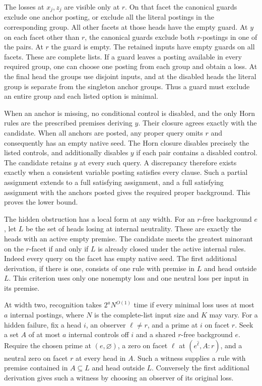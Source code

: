 The losses at $x_j,z_j$ are visible only at $r$.
On that facet the canonical guards exclude one anchor
posting, or exclude all the literal postings in the
corresponding group. All other facets at those heads
have the empty guard. At $y$ on each facet other than
$r$, the canonical guards exclude both $r$-postings
in one of the pairs. At $r$ the guard is empty.
The retained inputs have empty guards on all facets.
These are complete lists. If a guard leaves a posting
available in every required group, one can choose one
posting from each group and obtain a loss. At the
final head the groups use disjoint inputs, and at the
disabled heads the literal group is separate from
the singleton anchor groups. Thus a guard must exclude
an entire group and each listed option is minimal.

When an anchor is missing, no conditional control is
disabled, and the only Horn rules are the prescribed
premises deriving $y$. Their closure agrees exactly
with the candidate. When all anchors are posted, any
proper query omits $r$ and consequently has an empty
native seed. The Horn closure disables precisely the
listed controls, and additionally disables $y$ if
each pair contains a disabled control. The candidate
retains $y$ at every such query. A discrepancy
therefore exists exactly when a consistent variable
posting satisfies every clause. Such a partial
assignment extends to a full satisfying assignment,
and a full satisfying assignment with the anchors
posted gives the required proper background. This
proves the lower bound.

The hidden obstruction has a local form at any width.
For an $r$-free background $e$, let $L$ be the set
of heads losing at internal neutrality. These are
exactly the heads with an active empty premise.
The candidate meets the greatest minorant on the
$r$-facet if and only if $L$ is already closed under
the active internal rules. Indeed every query on the
facet has empty native seed. The first additional
derivation, if there is one, consists of one rule
with premise in $L$ and head outside $L$. This
criterion uses only one nonempty loss and one
neutral loss per input in its premise.

At width two, recognition takes $2^a N^{O(1)}$ time
if every minimal loss uses at most $a$ internal postings,
where $N$ is the complete-list input size and $K$ may
vary. For a hidden failure, fix a head $i$, an observer
$\ell\ne r$, and a prime at $i$ on facet $r$. Seek a
set $A$ of at most $a$ internal controls off $i$ and a
shared $r$-free background $e$. Require the chosen prime
at $(e,\varnothing)$, a zero on facet $\ell$ at
$(e^{\widehat\ell},A:r)$, and a neutral zero on facet
$r$ at every head in $A$. Such a witness supplies a rule
with premise contained in $A\subseteq L$ and head outside
$L$. Conversely the first additional derivation gives
such a witness by choosing an observer of its original loss.

